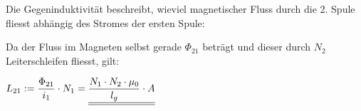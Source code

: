 \newpage


\beginbsp

Die Gegeninduktivität beschreibt, wieviel magnetischer Fluss durch die 2. Spule fliesst abhängig des Stromes der ersten Spule:

Da der Fluss im Magneten selbst gerade $\Phi_{21}$ beträgt und dieser durch $N_2$ Leiterschleifen fliesst, gilt:
\begin{center}

	$\displaystyle  L_{21} := \frac{\Phi_{21}}{i_1} \cdot N_1 =  \underline{\underline{\frac{N_1\cdot N_2 \cdot \mu_0}{l_g} \cdot A}}$
\end{center}
\iend






